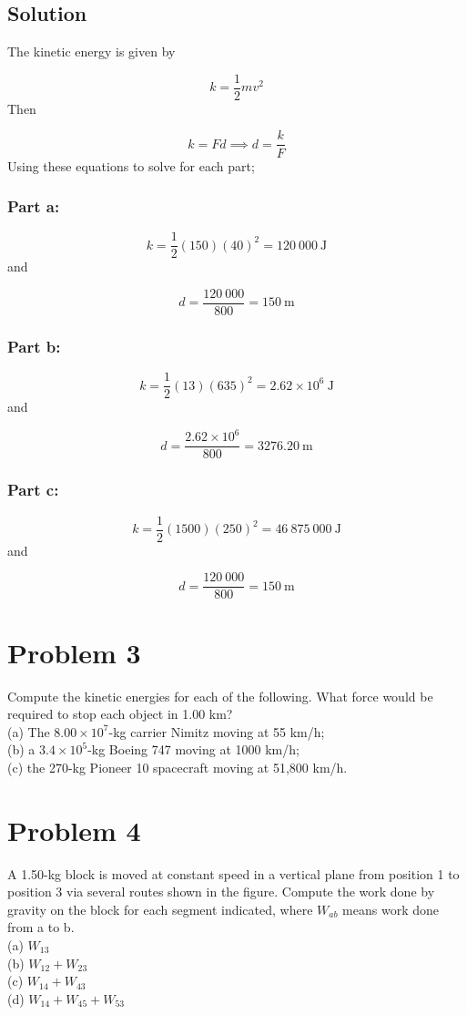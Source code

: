 \documentclass{article}
\begin{document}
\subsection*{Solution}
The kinetic energy is given by

\begin{equation}
	k = \frac{1}{2}mv^2
\end{equation}
Then

\[
	k = Fd \implies d = \frac{k}{F}
\]
Using these equations to solve for each part;
\subsubsection*{Part a:}
\[
	k = \frac{1}{2} (150)(40)^2 = \boxed{120\ 000\ \text{J}}
\]
and

\[
	d = \frac{120\ 000}{800} = \boxed{150\ \text{m}}
\]

\subsubsection*{Part b:}
\[
	k = \frac{1}{2} (13)(635)^2 = \boxed{2.62 \times 10^6\ \text{J}}
\]
and

\[
	d = \frac{2.62 \times 10^6}{800} = \boxed{3276.20\ \text{m}}
\]

\subsubsection*{Part c:}
\[
	k = \frac{1}{2} (1500)(250)^2 = \boxed{46\ 875\ 000\ \text{J}}
\]
and

\[
	d = \frac{120\ 000}{800} = \boxed{150\ \text{m}}
\]

\section*{Problem 3}
Compute the kinetic energies for each of the following. What force would be required to stop each object in
1.00 km? \\
(a) The $8.00 \times 10^7$-kg carrier Nimitz moving at 55 km/h; \\
(b) a $3.4 \times 10^5$-kg Boeing 747 moving at 1000 km/h; \\
(c) the 270-kg Pioneer 10 spacecraft moving at 51,800 km/h.

\section*{Problem 4}
A 1.50-kg block is moved at constant speed in a vertical plane from position 1 to position 3 via several
routes shown in the figure. Compute the work done by gravity on the block for each segment indicated,
where $W_{ab}$ means work done from a to b. \\
(a) $W_{13}$ \\
(b) $W_{12} + W_{23}$ \\
(c) $W_{14} + W_{43}$ \\
(d) $W_{14} + W_{45} + W_{53}$
\end{document}
